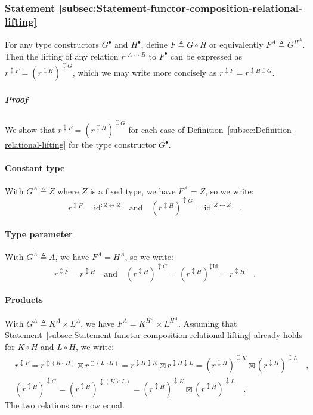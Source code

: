 \subsubsection{Statement \label{subsec:Statement-functor-composition-relational-lifting}\ref{subsec:Statement-functor-composition-relational-lifting}}

For any type constructors $G^{\bullet}$ and $H^{\bullet}$, define
$F\triangleq G\circ H$ or equivalently $F^{A}\triangleq G^{H^{A}}$.
Then the lifting of any relation $r^{:A\leftrightarrow B}$ to $F^{\bullet}$
can be expressed as $r^{\updownarrow F}=(r^{\updownarrow H})^{\updownarrow G}$,
which we may write more concisely as $r^{\updownarrow F}=r^{\updownarrow H\updownarrow G}$.

\subparagraph{Proof}

We show that $r^{\updownarrow F}=(r^{\updownarrow H})^{\updownarrow G}$
for each case of Definition~\ref{subsec:Definition-relational-lifting}
for the type constructor $G^{\bullet}$.

\paragraph{Constant type}

With $G^{A}\triangleq Z$ where $Z$ is a fixed type, we have $F^{A}=Z$,
so we write:
\[
r^{\updownarrow F}=\text{id}^{:Z\leftrightarrow Z}\quad\text{and}\quad(r^{\updownarrow H})^{\updownarrow G}=\text{id}^{:Z\leftrightarrow Z}\quad.
\]


\paragraph{Type parameter}

With $G^{A}\triangleq A$, we have $F^{A}=H^{A}$, so we write:
\[
r^{\updownarrow F}=r^{\updownarrow H}\quad\text{and}\quad(r^{\updownarrow H})^{\updownarrow G}=(r^{\updownarrow H})^{\updownarrow\text{Id}}=r^{\updownarrow H}\quad.
\]


\paragraph{Products}

With $G^{A}\triangleq K^{A}\times L^{A}$, we have $F^{A}=K^{H^{A}}\times L^{H^{A}}$.
Assuming that Statement~\ref{subsec:Statement-functor-composition-relational-lifting}
already holds for $K\circ H$ and $L\circ H$, we write:
\begin{align*}
 & r^{\updownarrow F}=r^{\updownarrow(K\circ H)}\boxtimes r^{\updownarrow(L\circ H)}=r^{\updownarrow H\updownarrow K}\boxtimes r^{\updownarrow H\updownarrow L}=(r^{\updownarrow H})^{\updownarrow K}\boxtimes(r^{\updownarrow H})^{\updownarrow L}\quad,\\
 & (r^{\updownarrow H})^{\updownarrow G}=(r^{\updownarrow H})^{\updownarrow(K\times L)}=(r^{\updownarrow H})^{\updownarrow K}\boxtimes(r^{\updownarrow H})^{\updownarrow L}\quad.
\end{align*}
The two relations are now equal.

